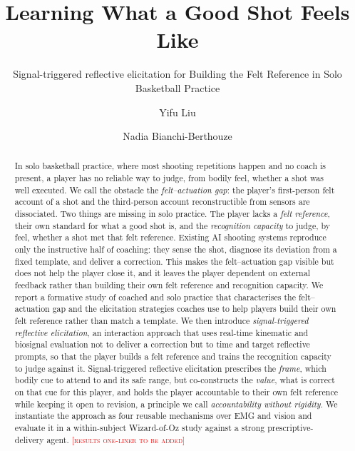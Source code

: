\documentclass[sigconf]{acmart}
\newcommand{\approach}{signal-triggered reflective elicitation} %
\newcommand{\Approach}{Signal-triggered reflective elicitation}
\newcommand{\vf}[1]{\textcolor{red}{[\textsc{#1}]}}
\begin{document}
\title{Learning What a Good Shot Feels Like}
\subtitle{\Approach{} for Building the Felt Reference in Solo Basketball Practice}

\author{Yifu Liu}


\author{Nadia Bianchi-Berthouze}

\renewcommand{\shortauthors}{Liu et al.}

\begin{abstract}
In solo basketball practice, where most shooting repetitions happen and no coach is present, a player has no reliable way to judge, from bodily feel, whether a shot was well executed. We call the obstacle the \emph{felt--actuation gap}: the player's first-person felt account of a shot and the third-person account reconstructible from sensors are dissociated. Two things are missing in solo practice. The player lacks a \emph{felt reference}, their own standard for what a good shot is, and the \emph{recognition capacity} to judge, by feel, whether a shot met that felt reference. Existing AI shooting systems reproduce only the instructive half of coaching: they sense the shot, diagnose its deviation from a fixed template, and deliver a correction. This makes the felt--actuation gap visible but does not help the player close it, and it leaves the player dependent on external feedback rather than building their own felt reference and recognition capacity. We report a formative study of coached and solo practice that characterises the felt--actuation gap and the elicitation strategies coaches use to help players build their own felt reference rather than match a template. We then introduce \emph{\approach}, an interaction approach that uses real-time kinematic and biosignal evaluation not to deliver a correction but to time and target reflective prompts, so that the player builds a felt reference and trains the recognition capacity to judge against it. \Approach{} prescribes the \emph{frame}, which bodily cue to attend to and its safe range, but co-constructs the \emph{value}, what is correct on that cue for this player, and holds the player accountable to their own felt reference while keeping it open to revision, a principle we call \emph{accountability without rigidity}. We instantiate the approach as four reusable mechanisms over EMG and vision and evaluate it in a within-subject Wizard-of-Oz study against a strong prescriptive-delivery agent. \vf{results one-liner to be added}
\end{abstract}
\end{document}
